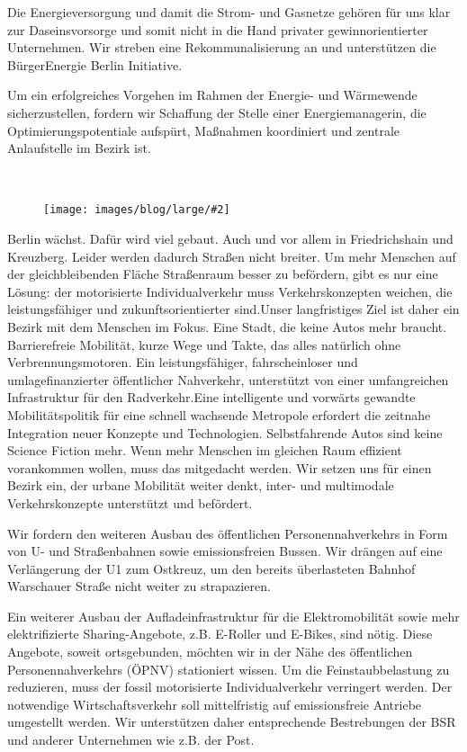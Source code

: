 \documentclass[a4paper,10pt]{article}
\newcommand{\mysection}[1]{{\vspace{1cm}\noindent\color{gray}{\ttfamily\LARGE\raggedright #1}\\\medskip}}
\newcommand{\abschnitt}[2]{%
\mysection{\raggedright #1}%
\begin{figure}[t]%
\vspace*{-2.7cm}%
\hspace*{-2.1cm}%
\texttt{[image: images/blog/large/\#2]} %
\end{figure}%
}
\begin{document}
Die Energieversorgung und damit die Strom- und Gasnetze gehören für uns
klar zur Daseinsvorsorge und somit nicht in die Hand privater
gewinnorientierter Unternehmen. Wir streben eine Rekommunalisierung an
und unterstützen die BürgerEnergie Berlin Initiative.

Um ein erfolgreiches Vorgehen im Rahmen der Energie- und Wärmewende
sicherzustellen, fordern wir Schaffung der Stelle einer
Energiemanagerin, die Optimierungspotentiale aufspürt, Maßnahmen
koordiniert und zentrale Anlaufstelle im Bezirk ist.

\clearpage
\abschnitt{Verkehr}{GefahrengebietA100}

Berlin wächst. Dafür wird viel gebaut. Auch und vor allem in
Friedrichshain und Kreuzberg. Leider werden dadurch Straßen nicht
breiter. Um mehr Menschen auf der gleichbleibenden Fläche Straßenraum
besser zu befördern, gibt es nur eine Lösung: der motorisierte
Individualverkehr muss Verkehrskonzepten weichen, die leistungsfähiger
und zukunftsorientierter sind.Unser langfristiges Ziel ist daher ein
Bezirk mit dem Menschen im Fokus. Eine Stadt, die keine Autos mehr
braucht. Barrierefreie Mobilität, kurze Wege und Takte, das alles
natürlich ohne Verbrennungsmotoren. Ein leistungsfähiger,
fahrscheinloser und umlagefinanzierter öffentlicher Nahverkehr,
unterstützt von einer umfangreichen Infrastruktur für den
Radverkehr.Eine intelligente und vorwärts gewandte Mobilitätspolitik für
eine schnell wachsende Metropole erfordert die zeitnahe Integration
neuer Konzepte und Technologien. Selbstfahrende Autos sind keine Science
Fiction mehr. Wenn mehr Menschen im gleichen Raum effizient vorankommen
wollen, muss das mitgedacht werden. Wir setzen uns für einen Bezirk ein,
der urbane Mobilität weiter denkt, inter- und multimodale
Verkehrskonzepte unterstützt und befördert.

Wir fordern den weiteren Ausbau des öffentlichen Personennahverkehrs in
Form von U- und Straßenbahnen sowie emissionsfreien Bussen. Wir drängen
auf eine Verlängerung der U1 zum Ostkreuz, um den bereits überlasteten
Bahnhof Warschauer Straße nicht weiter zu strapazieren.

Ein weiterer Ausbau der Aufladeinfrastruktur für die Elektromobilität
sowie mehr elektrifizierte Sharing-Angebote, z.B. E-Roller und E-Bikes,
sind nötig. Diese Angebote, soweit ortsgebunden, möchten wir in der Nähe
des öffentlichen Personennahverkehrs (ÖPNV) stationiert wissen. Um die
Feinstaubbelastung zu reduzieren, muss der fossil motorisierte
Individualverkehr verringert werden. Der notwendige Wirtschaftsverkehr
soll mittelfristig auf emissionsfreie Antriebe umgestellt werden. Wir
unterstützen daher entsprechende Bestrebungen der BSR und anderer
Unternehmen wie z.B. der Post.
\end{document}
